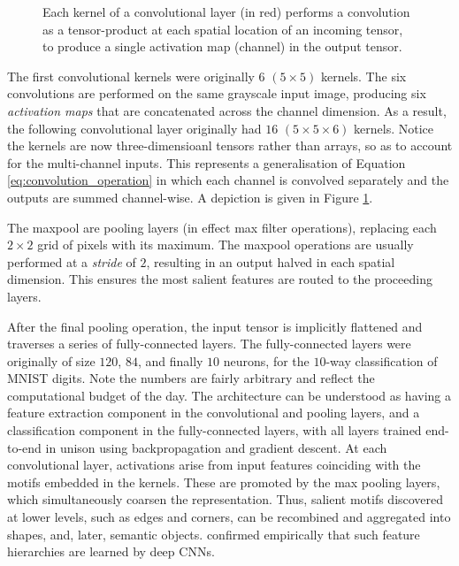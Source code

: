 \begin{figure}
\caption{Each kernel of a convolutional layer (in red) performs a convolution as a tensor-product at each spatial location of an incoming tensor, to produce a single activation map (channel) in the output tensor.}
\label{fig:convolutional_layer}
\end{figure}

The first convolutional kernels were originally $6$ $(5 \times 5)$ kernels. The six convolutions are performed on the same grayscale input image, producing six \emph{activation maps} that are concatenated across the channel dimension. As a result, the following convolutional layer originally had $16$ $(5 \times 5 \times 6)$ kernels. Notice the kernels are now three-dimensioanl tensors rather than arrays, so as to account for the multi-channel inputs. This represents a generalisation of Equation \ref{eq:convolution_operation} in which each channel is convolved separately and the outputs are summed channel-wise. A depiction is given in Figure \ref{fig:convolutional_layer}.

The maxpool are pooling layers (in effect max filter operations), replacing each $2\times2$ grid of pixels with its maximum. The maxpool operations are usually performed at a \emph{stride} of $2$, resulting in an output halved in each spatial dimension. This ensures the most salient features are routed to the proceeding layers.

After the final pooling operation, the input tensor is implicitly flattened and traverses a series of fully-connected layers. The fully-connected layers were originally of size $120$, $84$, and finally $10$ neurons, for the $10$-way classification of MNIST digits. Note the numbers are fairly arbitrary and reflect the computational budget of the day. The architecture can be understood as having a feature extraction component in the convolutional and pooling layers, and a classification component in the fully-connected layers, with all layers trained end-to-end in unison using backpropagation and gradient descent. At each convolutional layer, activations arise from input features coinciding with the motifs embedded in the kernels. These are promoted by the max pooling layers, which simultaneously coarsen the representation. Thus, salient motifs discovered at lower levels, such as edges and corners, can be recombined and aggregated into shapes, and, later, semantic objects. \cite{zeiler2014visualizing} confirmed empirically that such feature hierarchies are learned by deep CNNs.

